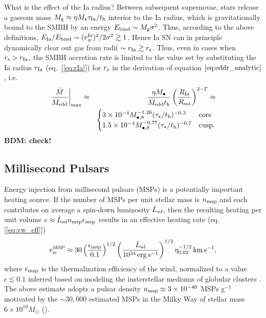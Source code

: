 \documentclass[usenatbib,fleqn]{mn2e}
\newcommand{\Mbheight}{M_{\bullet,8}}
\begin{document}
What is the effect of the Ia radius?  Between subsequent supernovae, stars release a gaseous mass $M_{\rm g} \approx \eta M_{\star}\tau_{\rm Ia}/t_{\rm h}$ interior to the Ia radius, which is gravitationally bound to the SMBH by an energy $E_{\rm bind} \sim M_{\rm g}\sigma^{2}$.  Thus, according to the above definitions, $E_{\rm Ia}/E_{\rm bind} \sim (v_{w}^{\rm Ia})^{2}/2\sigma^{2} \gtrsim 1$.  Hence Ia SN can in principle dynamically clear out gas from radii $\sim r_{\rm Ia} \gtrsim r_{\rm s}$.  Thus, even in cases when $r_{\rm s} > r_{\rm Ia}$, the SMBH accretion rate is limited to the value set by substituting the Ia radius $r_{\rm Ia}$ (eq.~[\ref{eq:rIa}]) for $r_{\rm s}$ in the derivation of equation $\ref{eq:eddr_analytic}$, i.e.  
\begin{eqnarray}
\left.\frac{\dot{M}}{\dot{M}_{\rm edd}}\right|_{\rm max} &\approx& \frac{\eta M_{\bullet}}{\dot{M}_{\rm edd} t_{\rm h}}\left(\frac{R_{\rm Ia}}{R_{\rm soi}}\right)^{2-\Gamma} \approx \nonumber \\
 && \begin{cases}
    3 \times 10^{-4} M_{\bullet,8}^{-1.26}(\tau_{\star}/t_{\rm h})^{-0.3}
   & \text{core} \\
    1.5 \times 10^{-4} \Mbheight^{-0.77}(\tau_{\star}/t_{\rm h})^{-0.7}   & \text{cusp}.
  \end{cases}
  \label{eq:eddr_Ia}
\end{eqnarray}
{\bf BDM: check!}


\subsection{Millisecond Pulsars}
 Energy injection from millisecond pulsars (MSPs) is a potentially
important heating source.  If the number of MSPs per unit stellar mass
is $n_{\rm msp}$ and each contributes on average a spin-down
luminosity $\bar{L}_{\rm sd}$, then the resulting heating per unit
volume $e \approx \bar{L}_{\rm sd}n_{\rm msp}\epsilon_{\rm msp}$ results in an
effective heating rate (eq.~ [\ref{eq:vw_eff}])
\begin{eqnarray} v_{w}^{\rm MSP} \approx
30\left(\frac{\epsilon_{\rm msp}}{0.1}\right)^{1/2}\left(\frac{\bar{L}_{\rm
sd}}{10^{34}\,{\rm erg\,s^{-1}}}\right)^{1/2} \eta_{0.02}^{-1/2}\,{\rm
km\,s^{-1}},
 \label{eq:vmsp}
  \end{eqnarray} 
where $\epsilon_{\rm msp}$ is the thermalization efficiency of
the wind, normalized to a value $\epsilon \lesssim 0.1$ inferred based
on modeling the insterstellar mediums of globular clusters
\citep{NaimanSoares-Furtado+:2013a}.  The above estimate adopts a
pulsar density $n_{\rm msp}\simeq3 \times 10^{-40} $ MSPs g$^{-1}$
motivated by the $\sim 30,000$ estimated MSPs in the Milky Way of
stellar mass $6\times 10^{10}M_{\odot}$ (\citealt{Lorimer13}).
\end{document}
